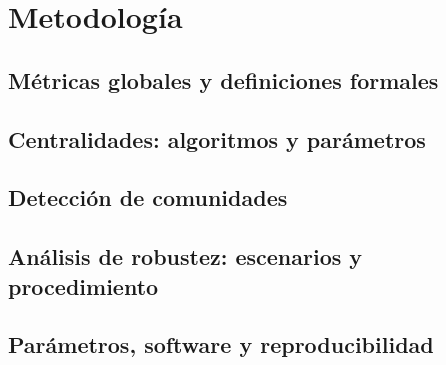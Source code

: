 \chapter{Metodología}
    \section{Métricas globales y definiciones formales}
    \section{Centralidades: algoritmos y parámetros}
    \section{Detección de comunidades}
    \section{Análisis de robustez: escenarios y procedimiento}
    \section{Parámetros, software y reproducibilidad}
